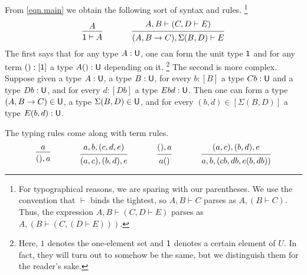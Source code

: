 \documentclass[11pt, one side, article]{memoir}
\theoremstyle{definition}
\theoremstyle{plain}
\newcommand{\tn}[1]{\textnormal{#1}}
\newcommand{\0}{\textsf{0}}
\newcommand{\1}{\tn{\textsf{1}}}
\newcommand{\U}{\tn{\textsf{U}}}
\begin{document}
From \cref{eqn.main} we obtain the following sort of syntax and rules.%
\footnote{For typographical reasons, we are sparing with our parentheses. We use the convention that $\vdash$ binds the tightest, so $A,B\vdash C$ parses as $A,(B\vdash C)$. Thus, the expression $A, B\vdash (C, D\vdash E)$ parses as $A,(B\vdash(C, (D\vdash E)))$.}
\begin{equation}\label{eqn:premise_axiom}
  \begin{prooftree}
    \Hypo{A}
    \Infer1{\1\vdash A}
  \end{prooftree}
\hspace{.5in}
  \begin{prooftree}
    \Hypo{A, B\vdash (C, D\vdash E)}
    \Infer1{(A,B\to C),\Sigma(B,D)\vdash E}
  \end{prooftree}
\end{equation}
The first says that for any type $A:\U$, one can form the unit type $\1$ and for any term $():[\1]$ a type $A():\U$ depending on it.%
\footnote{Here, $1$ denotes the one-element set and $\1$ denotes a certain element of $U$. In fact, they will turn out to somehow be the same, but we distinguish them for the reader's sake.}
 The second is more complex. Suppose given a type $A:\U$, a type $B:\U$, for every $b:[B]$ a type $Cb:\U$ and a type $Db:\U$, and for every $d:[Db]$ a type $Ebd:\U$. Then one can form a type $(A,B\to C)\in \U$, a type $\Sigma(B,D)\in \U$, and for every $(b, d)\in [\Sigma(B,D)]$ a type $E(b,d):\U$. 

The typing rules come along with term rules. 
\begin{equation}\label{eqn.premise_axiom}
  \begin{prooftree}
    \Hypo{a}
    \Infer1{(),a}
  \end{prooftree}
\hspace{.5in}
  \begin{prooftree}
    \Hypo{a, b, (c, d, e)}
    \Infer1{(a,c), (b,d), e}
  \end{prooftree}
\hspace{.5in}
  \begin{prooftree}
    \Hypo{(),a}
    \Infer1{a()}
  \end{prooftree}
\hspace{.5in}
  \begin{prooftree}
    \Hypo{(a,c), (b,d), e}
    \Infer1{a,b,(cb, db ,e(b, db))}
  \end{prooftree}
\end{equation}
\end{document}
